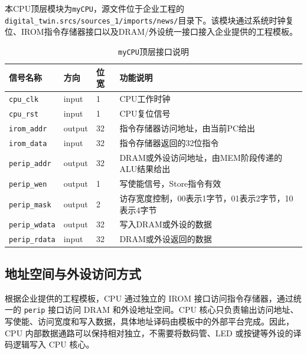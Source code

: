 \documentclass[12pt,a4paper]{ctexart}
\newcommand{\code}[1]{\texttt{#1}}
\begin{document}
本CPU顶层模块为\code{myCPU}，源文件位于企业工程的\code{digital\_twin.srcs/sources\_1/imports/news/}目录下。该模块通过系统时钟复位、IROM指令存储器接口以及DRAM/外设统一接口接入企业提供的工程模板。

\begin{table}[H]
\centering
\caption{\code{myCPU}顶层接口说明}
\begin{tabularx}{\textwidth}{p{3cm}p{2cm}p{2cm}X}
\toprule
信号名称 & 方向 & 位宽 & 功能说明 \\
\midrule
\code{cpu\_clk} & input & 1 & CPU工作时钟 \\
\code{cpu\_rst} & input & 1 & CPU复位信号 \\
\code{irom\_addr} & output & 32 & 指令存储器访问地址，由当前PC给出 \\
\code{irom\_data} & input & 32 & 指令存储器返回的32位指令 \\
\code{perip\_addr} & output & 32 & DRAM或外设访问地址，由MEM阶段传递的ALU结果给出 \\
\code{perip\_wen} & output & 1 & 写使能信号，Store指令有效 \\
\code{perip\_mask} & output & 2 & 访存宽度控制，00表示1字节，01表示2字节，10表示4字节 \\
\code{perip\_wdata} & output & 32 & 写入DRAM或外设的数据 \\
\code{perip\_rdata} & input & 32 & DRAM或外设返回的数据 \\
\bottomrule
\end{tabularx}
\end{table}


\subsection{地址空间与外设访问方式}

根据企业提供的工程模板，CPU 通过独立的 IROM 接口访问指令存储器，通过统一的 \code{perip} 接口访问 DRAM 和外设地址空间。CPU 核心只负责输出访问地址、写使能、访问宽度和写入数据，具体地址译码由模板中的外部平台完成。因此，CPU 内部数据通路可以保持相对独立，不需要将数码管、LED 或按键等外设的译码逻辑写入 CPU 核心。
\end{document}
